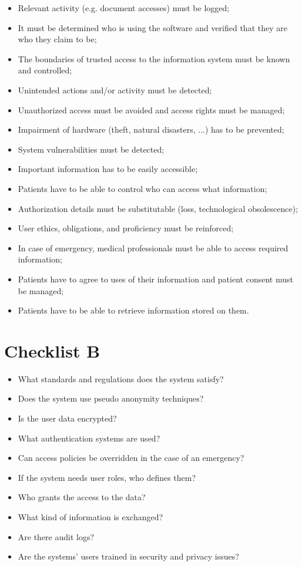 \begin{itemize}
	\item Relevant activity (e.g. document accesses) must be logged;
	\item It must be determined who is using the software and verified that they are who they claim to be;
	\item The boundaries of trusted access to the information system must be known and controlled;
	\item Unintended actions and/or activity must be detected;
	\item Unauthorized access must be avoided and access rights must be managed;
	\item Impairment of hardware (theft, natural disasters, ...) has to be prevented;
	\item System vulnerabilities must be detected;
	\item Important information has to be easily accessible;
	\item Patients have to be able to control who can access what information;
	\item Authorization details must be substitutable (loss, technological obsolescence);
	\item User ethics, obligations, and proficiency must be reinforced;
	\item In case of emergency, medical professionals must be able to access required information;
	\item Patients have to agree to uses of their information and patient consent must be managed;
	\item Patients have to be able to retrieve information stored on them.
\end{itemize}

\section{Checklist B}
\label{security-checklists-b}

\begin{itemize}
	\item What standards and regulations does the system satisfy?
	\item Does the system use pseudo anonymity techniques?
	\item Is the user data encrypted? 
	\item What authentication systems are used? 
	\item Can access policies be overridden in the case of an emergency? 
	\item If the system needs user roles, who defines them? 
	\item Who grants the access to the data? 
	\item What kind of information is exchanged? 
	\item Are there audit logs?
	\item Are the systems' users trained in security and privacy issues? 
\end{itemize}